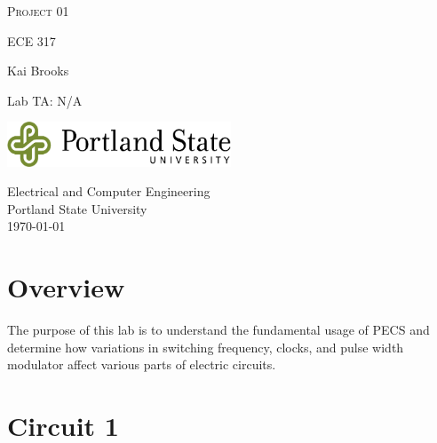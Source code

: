 \documentclass[a4paper,12pt]{article}
\begin{document}

\begin{titlepage}
	\begin{center}
		\vspace*{1cm}

		\huge\textsc{Project 01}

		\vspace{0.5cm}
		\small\textsc{ECE 317}
		
		\vspace{1.5cm}
		\normalsize Kai Brooks
		
		\vspace{0.5cm}
		Lab TA: N/A
		
		\vfill
		\vspace{0.8cm}
		
		\includegraphics[width=0.5\textwidth]{images/psulogo_horiz_msword.tif}
		
		\vspace{0.5cm}
		Electrical and Computer Engineering\\
		Portland State University\\
		\today
		 
	\end{center}
\end{titlepage}

\newpage
\tableofcontents


\newpage
{}

\section{Overview}
The purpose of this lab is to understand the fundamental usage of PECS and determine how variations in switching frequency, clocks, and pulse width modulator affect various parts of electric circuits.

\section{Circuit 1}
\end{document}
